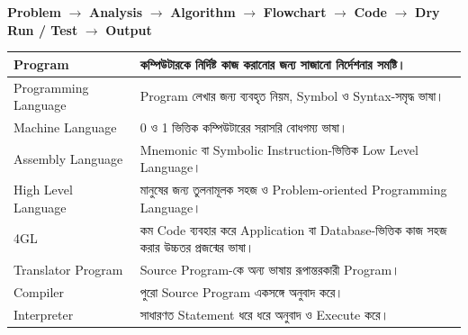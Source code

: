 \begin{rememberbox}

\begin{center}

\textbf{Problem}
\(\rightarrow\)
\textbf{Analysis}
\(\rightarrow\)
\textbf{Algorithm}
\(\rightarrow\)
\textbf{Flowchart}
\(\rightarrow\)
\textbf{Code}
\(\rightarrow\)
\textbf{Dry Run / Test}
\(\rightarrow\)
\textbf{Output}

\end{center}

\end{rememberbox}


\begin{longtable}{
|L{0.28\textwidth}
|L{0.64\textwidth}|
}

\endfirsthead

\endhead

Program
&
কম্পিউটারকে নির্দিষ্ট কাজ করানোর জন্য সাজানো নির্দেশনার সমষ্টি।
\\
\hline

Programming Language
&
Program লেখার জন্য ব্যবহৃত নিয়ম, Symbol ও Syntax-সমৃদ্ধ ভাষা।
\\
\hline

Machine Language
&
0 ও 1 ভিত্তিক কম্পিউটারের সরাসরি বোধগম্য ভাষা।
\\
\hline

Assembly Language
&
Mnemonic বা Symbolic Instruction-ভিত্তিক Low Level Language।
\\
\hline

High Level Language
&
মানুষের জন্য তুলনামূলক সহজ ও Problem-oriented Programming Language।
\\
\hline

4GL
&
কম Code ব্যবহার করে Application বা Database-ভিত্তিক কাজ সহজ করার উচ্চতর প্রজন্মের ভাষা।
\\
\hline

Translator Program
&
Source Program-কে অন্য ভাষায় রূপান্তরকারী Program।
\\
\hline

Compiler
&
পুরো Source Program একসঙ্গে অনুবাদ করে।
\\
\hline

Interpreter
&
সাধারণত Statement ধরে ধরে অনুবাদ ও Execute করে।
\\
\hline


\end{longtable}
